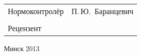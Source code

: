 \begin{titlepage}
\begin{center}
\begin{tabular}{ p{}p{} }
      Нормоконтролёр & П.\,Ю.~Баранцевич\\
      & \\
      Рецензент &
    \end{tabular}
    
    \vfill
    {\normalsize Минск 2013}
  \end{center}
\end{titlepage}
